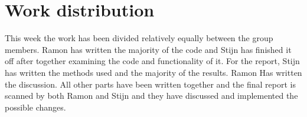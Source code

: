 \documentclass[twoside, a4paper, fleqn, reqno]{article}
\begin{document}
\section*{Work distribution}

This week the work has been divided relatively equally between the group members.
Ramon has written the majority of the code and Stijn has finished it off after together examining the code and functionality of it.
For the report, Stijn has written the methods used and the majority of the results.
Ramon Has written the discussion.
All other parts have been written together and the final report is scanned by both Ramon and Stijn and they have discussed and implemented the possible changes.
\end{document}
